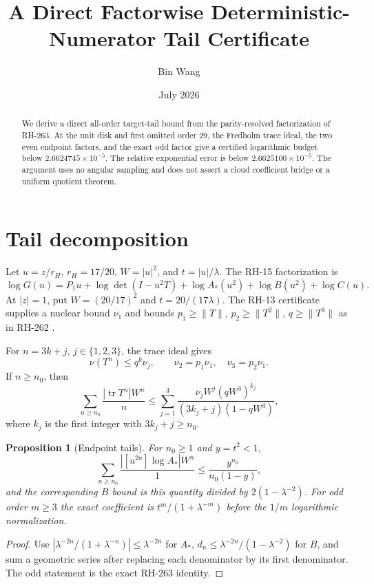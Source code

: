 \documentclass[11pt]{article}
\title{A Direct Factorwise Deterministic-Numerator Tail Certificate}
\author{Bin Wang}\date{July 2026}
\newtheorem{proposition}[theorem]{Proposition}
\theoremstyle{remark}\newtheorem{remark}[theorem]{Remark}
\begin{document}
\maketitle

\begin{abstract}
We derive a direct all-order target-tail bound from the parity-resolved
factorization of RH-263.  At the unit disk and first omitted order $29$, the
Fredholm trace ideal, the two even endpoint factors, and the exact odd factor
give a certified logarithmic budget below $2.6624745\times10^{-5}$.  The
relative exponential error is below $2.6625100\times10^{-5}$.  The argument
uses no angular sampling and does not assert a cloud coefficient bridge or a
uniform quotient theorem.
\end{abstract}

\section{Tail decomposition}
Let $u=z/r_H$, $r_H=17/20$, $W=|u|^2$, and $t=|u|/\lambda$.
The RH-15 factorization is
\[
 \log G(u)=P_1u+\log\det(I-u^2T)+\log A_*(u^2)+\log B(u^2)+\log C(u).
\]
At $|z|=1$, put $W=(20/17)^2$ and $t=20/(17\lambda)$.  The RH-13
certificate supplies a nuclear bound $\nu_1$ and bounds $p_1\ge\|T\|$,
$p_2\ge\|T^2\|$, $q\ge\|T^3\|$ as in RH-262 \citep{WangRH13}.

For $n=3k+j$, $j\in\{1,2,3\}$, the trace ideal gives
\[
 \nu(T^n)\le q^k\nu_j,
 \qquad \nu_2=p_1\nu_1,\quad \nu_3=p_2\nu_1.
\]
If $n\ge n_0$, then
\begin{equation}
 \sum_{n\ge n_0}\frac{|\operatorname{tr}T^n|W^n}{n}
 \le \sum_{j=1}^3
 \frac{\nu_jW^j(qW^3)^{k_j}}
 {(3k_j+j)(1-qW^3)},
 \label{eq:fredtail}
\end{equation}
where $k_j$ is the first integer with $3k_j+j\ge n_0$.

\begin{proposition}[Endpoint tails]
For $n_0\ge1$ and $y=t^2<1$,
\[
 \sum_{n\ge n_0}\frac{|[u^{2n}]\log A_*|W^n}{1}
 \le\frac{y^{n_0}}{n_0(1-y)},
\]
and the corresponding $B$ bound is this quantity divided by
$2(1-\lambda^{-2})$.  For odd order $m\ge3$ the exact coefficient is
$t^m/(1+\lambda^{-m})$ before the $1/m$ logarithmic normalization.
\end{proposition}

\begin{proof}
Use $|\lambda^{-2n}/(1+\lambda^{-n})|\le\lambda^{-2n}$ for $A_*$,
$d_n\le\lambda^{-2n}/(1-\lambda^{-2})$ for $B$, and sum a geometric
series after replacing each denominator by its first denominator.  The odd
statement is the exact RH-263 identity.
\end{proof}
\end{document}

